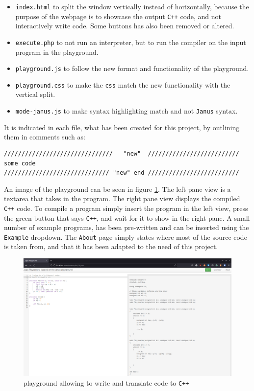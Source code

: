 \begin{itemize}
    \item \texttt{index.html} to split the window vertically instead of horizontally,
          because the purpose of the webpage is to showcase the output \texttt{C++}
          code, and not interactively write \lan code. Some buttons has also been
          removed or altered.

    \item \texttt{execute.php} to not run an interpreter, but to run the \lan compiler
          on the input program in the playground.

    \item \texttt{playground.js} to follow the new format and functionality of the playground.

    \item \texttt{playground.css} to make the \texttt{css} match the new functionality with
          the vertical split.

    \item \texttt{mode-janus.js} to make syntax highlighting match \lan and not
          \texttt{Janus} syntax.
\end{itemize}
\noindent
It is indicated in each file, what has been created for this project, by outlining them
in comments such as:
\begin{lstlisting}
///////////////////////////////   "new"  //////////////////////////
some code
////////////////////////////// "new" end //////////////////////////
\end{lstlisting}
\noindent
An image of the \lan playground can be seen in figure \ref{fig:japa-playground}.
The left pane view is a textarea that takes in the \lan program. The right pane view
displays the compiled \texttt{C++} code. To compile a \lan program simply insert the program
in the left view, press the green button that says \texttt{C++}, and wait for it to show
in the right pane. A small number of example programs, has been pre-written and can be inserted
using the \texttt{Example} dropdown. The \texttt{About} page simply states where most of the
source code is taken from, and that it has been adapted to the need of this project.

\begin{figure}[H]
    \centering
    \includegraphics[width=\textwidth]{imgs/japa-playground.png}
    \caption{\lan playground allowing to write and translate \lan code to \texttt{C++}}
    \label{fig:japa-playground}
\end{figure}